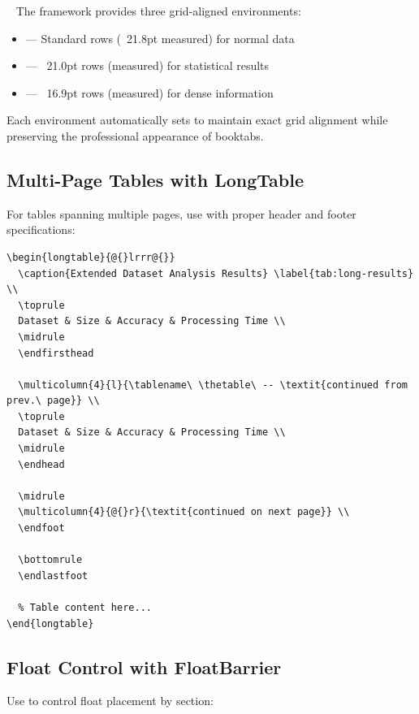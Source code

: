 \documentclass[11pt]{article}
\begin{document}
~ The framework provides three grid-aligned environments:
\begin{itemize}
\item {} --- Standard rows (~21.8pt measured) for normal data
\item {} --- ~21.0pt rows (measured) for statistical results
\item {} --- ~16.9pt rows (measured) for dense information
\end{itemize}

Each environment automatically sets  to maintain exact grid alignment while preserving the professional appearance of booktabs.

\subsection{Multi-Page Tables with LongTable}

For tables spanning multiple pages, use  with proper header and footer specifications:

\begin{verbatim}
\begin{longtable}{@{}lrrr@{}}
  \caption{Extended Dataset Analysis Results} \label{tab:long-results} \\
  \toprule
  Dataset & Size & Accuracy & Processing Time \\
  \midrule
  \endfirsthead
  
  \multicolumn{4}{l}{\tablename\ \thetable\ -- \textit{continued from prev.\ page}} \\
  \toprule
  Dataset & Size & Accuracy & Processing Time \\
  \midrule
  \endhead
  
  \midrule
  \multicolumn{4}{@{}r}{\textit{continued on next page}} \\
  \endfoot
  
  \bottomrule
  \endlastfoot
  
  % Table content here...
\end{longtable}
\end{verbatim}

\subsection{Float Control with FloatBarrier}

Use  to control float placement by section:
\end{document}
